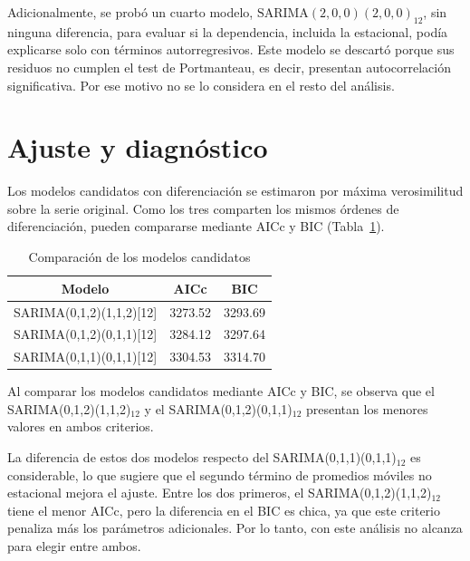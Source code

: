 \documentclass[
  spanish,
  11pt,
  letterpaper,
  DIV=11,
  numbers=noendperiod]{scrartcl}
\begin{document}
Adicionalmente, se probó un cuarto modelo,
\(\text{SARIMA}(2,0,0)(2,0,0)_{12}\), sin ninguna diferencia, para
evaluar si la dependencia, incluida la estacional, podía explicarse solo
con términos autorregresivos. Este modelo se descartó porque sus
residuos no cumplen el test de Portmanteau, es decir, presentan
autocorrelación significativa. Por ese motivo no se lo considera en el
resto del análisis.

\section{Ajuste y diagnóstico}\label{ajuste-y-diagnuxf3stico}

Los modelos candidatos con diferenciación se estimaron por máxima
verosimilitud sobre la serie original. Como los tres comparten los
mismos órdenes de diferenciación, pueden compararse mediante AICc y BIC
(Tabla~\ref{tbl-aicc}).

{

\begin{longtable}[]{@{}ccc@{}}

\caption{\label{tbl-aicc}Comparación de los modelos candidatos}

\tabularnewline

\toprule\noalign{}
Modelo & AICc & BIC \\
\midrule\noalign{}
\endhead
\bottomrule\noalign{}
\endlastfoot
SARIMA(0,1,2)(1,1,2){[}12{]} & 3273.52 & 3293.69 \\
SARIMA(0,1,2)(0,1,1){[}12{]} & 3284.12 & 3297.64 \\
SARIMA(0,1,1)(0,1,1){[}12{]} & 3304.53 & 3314.70 \\

\end{longtable}

}

Al comparar los modelos candidatos mediante AICc y BIC, se observa que
el SARIMA(0,1,2)(1,1,2)\(_{12}\) y el SARIMA(0,1,2)(0,1,1)\(_{12}\)
presentan los menores valores en ambos criterios.

La diferencia de estos dos modelos respecto del
SARIMA(0,1,1)(0,1,1)\(_{12}\) es considerable, lo que sugiere que el
segundo término de promedios móviles no estacional mejora el ajuste.
Entre los dos primeros, el SARIMA(0,1,2)(1,1,2)\(_{12}\) tiene el menor
AICc, pero la diferencia en el BIC es chica, ya que este criterio
penaliza más los parámetros adicionales. Por lo tanto, con este análisis
no alcanza para elegir entre ambos.
\end{document}
